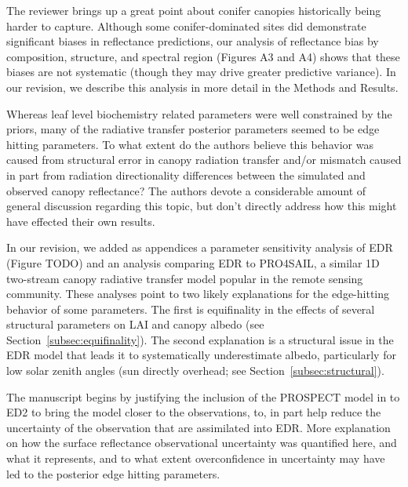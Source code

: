 The reviewer brings up a great point about conifer canopies historically being harder to capture.
Although some conifer-dominated sites did demonstrate significant biases in reflectance predictions, our analysis of reflectance bias by composition, structure, and spectral region (Figures A3 and A4) shows that these biases are not systematic (though they may drive greater predictive variance).
In our revision, we describe this analysis in more detail in the Methods and Results.


\begin{reviewer}
  Whereas leaf level biochemistry related parameters were well constrained by the priors, many of the radiative transfer posterior parameters seemed to be edge hitting parameters.
  To what extent do the authors believe this behavior was caused from structural error in canopy radiation transfer and/or mismatch caused in part from radiation directionality differences between the simulated and observed canopy reflectance?
  The authors devote a considerable amount of general discussion regarding this topic, but don’t directly address how this might have effected their own results.
\end{reviewer}

In our revision, we added as appendices a parameter sensitivity analysis of EDR (Figure TODO) and an analysis comparing EDR to PRO4SAIL, a similar 1D two-stream canopy radiative transfer model popular in the remote sensing community.
These analyses point to two likely explanations for the edge-hitting behavior of some parameters.
The first is equifinality in the effects of several structural parameters on LAI and canopy albedo (see Section~\ref{subsec:equifinality}).
The second explanation is a structural issue in the EDR model that leads it to systematically underestimate albedo, particularly for low solar zenith angles (sun directly overhead; see Section~\ref{subsec:structural}).

\begin{reviewer}
  The manuscript begins by justifying the inclusion of the PROSPECT model in to ED2 to bring the model closer to the observations, to, in part help reduce the uncertainty of the observation that are assimilated into EDR.\@
  More explanation on how the surface reflectance observational uncertainty was quantified here, and what it represents, and to what extent overconfidence in uncertainty may have led to the posterior edge hitting parameters.
\end{reviewer}

